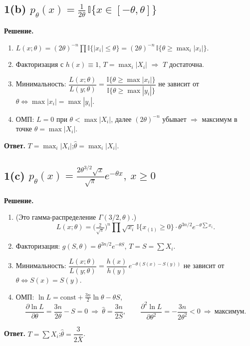 \documentclass[12pt,a4paper]{article}
\newcommand{\I}{\mathbb{I}}
\newcommand{\sol}{\par\noindent\textbf{Решение.} }
\newcommand{\ans}{\par\smallskip\noindent\textbf{Ответ.} }
\begin{document}
\subsection*{1(b) \quad $p_\theta(x)=\frac1{2\theta}\,\I\{x\in[-\theta,\theta]\}$}
\sol
\begin{enumerate}
  \item $L(x;\theta)=(2\theta)^{-n}\prod\I\{|x_i|\le\theta\}
        =(2\theta)^{-n}\,\I\{\theta\ge \max_i|x_i|\}$.
  \item Факторизация с $h(x)\equiv1$, $T=\max_i|X_i|$ $\Rightarrow$ $T$ достаточна.
  \item Минимальность: $\dfrac{L(x;\theta)}{L(y;\theta)}
        =\dfrac{\I\{\theta\ge\max|x_i|\}}{\I\{\theta\ge\max|y_i|\}}$ не зависит
        от $\theta\iff \max|x_i|=\max|y_i|$.
  \item ОМП: $L=0$ при $\theta<\max|X_i|$, далее $(2\theta)^{-n}$ убывает
        $\Rightarrow$ максимум в точке $\theta=\max|X_i|$.
\end{enumerate}
\ans $T=\max_i|X_i|$;\quad $\hat\theta=\max_i|X_i|$.

\subsection*{1(c) \quad $p_\theta(x)=\frac{2\theta^{3/2}\sqrt x}{\sqrt\pi}e^{-\theta x},\ x\ge0$}
\sol
\begin{enumerate}
  \item (Это гамма-распределение $\Gamma(3/2,\theta)$.)
  \[
    L(x;\theta)=\Big(\tfrac{2}{\sqrt\pi}\Big)^n\prod\sqrt{x_i}\,\I\{x_{(1)}\ge0\}
      \cdot \theta^{3n/2}e^{-\theta\sum x_i}.
  \]
  \item Факторизация: $g(S,\theta)=\theta^{3n/2}e^{-\theta S}$, $T=S=\sum X_i$.
  \item Минимальность: $\dfrac{L(x;\theta)}{L(y;\theta)}
        =\dfrac{h(x)}{h(y)}\,e^{-\theta(S(x)-S(y))}$ не зависит от
        $\theta\iff S(x)=S(y)$.
  \item ОМП: $\ln L=\text{const}+\frac{3n}{2}\ln\theta-\theta S$,
  \[
    \frac{\partial\ln L}{\partial\theta}=\frac{3n}{2\theta}-S=0
    \ \Rightarrow\ \hat\theta=\frac{3n}{2S},\qquad
    \frac{\partial^2\ln L}{\partial\theta^2}=-\frac{3n}{2\theta^2}<0
    \ \Rightarrow\ \text{максимум}.
  \]
\end{enumerate}
\ans $T=\sum X_i$;\quad $\hat\theta=\dfrac{3}{2\bar X}$.
\end{document}
